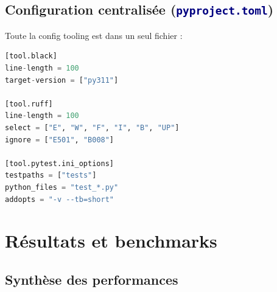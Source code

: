 \documentclass[11pt,a4paper,oneside]{report}
\newcommand{\code}[1]{\texttt{\textcolor{navy}{#1}}}
\begin{document}
\section{Configuration centralisée (\code{pyproject.toml})}

Toute la config tooling est dans un seul fichier :

\begin{lstlisting}[language=Python, caption={Extrait de pyproject.toml}]
[tool.black]
line-length = 100
target-version = ["py311"]

[tool.ruff]
line-length = 100
select = ["E", "W", "F", "I", "B", "UP"]
ignore = ["E501", "B008"]

[tool.pytest.ini_options]
testpaths = ["tests"]
python_files = "test_*.py"
addopts = "-v --tb=short"
\end{lstlisting}

\chapter{Résultats et benchmarks}

\section{Synthèse des performances}
\end{document}
